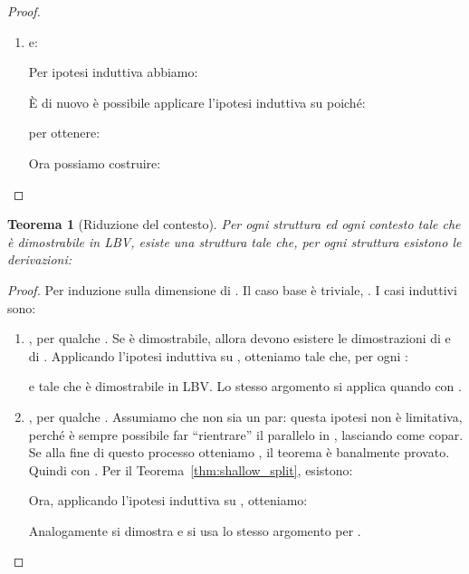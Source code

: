 \documentclass[12pt,a4paper,openright,twoside]{report}
\newtheorem{thm}{Teorema}[section]
\begin{document}
\begin{proof}
\begin{enumerate}
\begin{enumerate}[label=\arabic{enumi}.\arabic*.]
		Ora possiamo applicare nuovamente l'ipotesi induttiva su  e su : infatti, anche se non conosciamo l'altezza di queste due dimostrazioni, sappiamo che la loro dimensione \`e inferiore a:
		
		perch\'e per ipotesi, l'istanza di  non \`e triviale. Pertanto abbiamo per ipotesi induttiva:
		
		Ora, ponendo  e  otteniamo:
		

		\item  e:
		
		Per ipotesi induttiva abbiamo:
		
		\`E di nuovo \`e possibile applicare l'ipotesi induttiva su  poich\'e:
		
		per ottenere:
		
		Ora possiamo costruire:
		
	\end{enumerate}
\end{enumerate}
\end{proof}

\begin{thm}[Riduzione del contesto]\label{thm:ctx_reduction}
Per ogni struttura  ed ogni contesto  tale che  \`e dimostrabile in \textsf{LBV}, esiste una struttura  tale che, per ogni struttura  esistono le derivazioni:

\end{thm}
\begin{proof}
Per induzione sulla dimensione di . Il caso base \`e triviale, . I casi induttivi sono:
\begin{enumerate}
	\item , per qualche . Se  \`e dimostrabile, allora devono esistere le dimostrazioni di  e di . Applicando l'ipotesi induttiva su , otteniamo  tale che, per ogni :
	
	e tale che  \`e dimostrabile in \textsf{LBV}. Lo stesso argomento si applica quando  con .
	\item , per qualche . Assumiamo che  non sia un par: questa ipotesi non \`e limitativa, perch\'e \`e sempre possibile far ``rientrare'' il parallelo in , lasciando  come copar. Se alla fine di questo processo otteniamo , il teorema \`e banalmente provato. Quindi  con . Per il Teorema~\ref{thm:shallow_split}, esistono:
	
	Ora, applicando l'ipotesi induttiva su , otteniamo:
	
	Analogamente si dimostra  e si usa lo stesso argomento per .
\end{enumerate}
\end{proof}
\end{document}
